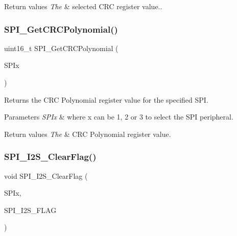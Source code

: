 \begin{DoxyRetVals}{Return values}
{\em The} & selected C\+RC register value.. \\
\hline
\end{DoxyRetVals}
\mbox{\label{group___s_p_i___exported___functions_ga80fb9374cfce670f29128bb78568353f}} 
\subsubsection{\texorpdfstring{SPI\_GetCRCPolynomial()}{SPI\_GetCRCPolynomial()}}
{\footnotesize\ttfamily uint16\+\_\+t S\+P\+I\+\_\+\+Get\+C\+R\+C\+Polynomial (\begin{DoxyParamCaption}\item[{\mbox{\hyperlink{struct_s_p_i___type_def}{S\+P\+I\+\_\+\+Type\+Def}} $\ast$}]{S\+P\+Ix }\end{DoxyParamCaption})}



Returns the C\+RC Polynomial register value for the specified S\+PI. 


\begin{DoxyParams}{Parameters}
{\em S\+P\+Ix} & where x can be 1, 2 or 3 to select the S\+PI peripheral. \\
\hline
\end{DoxyParams}

\begin{DoxyRetVals}{Return values}
{\em The} & C\+RC Polynomial register value. \\
\hline
\end{DoxyRetVals}
\mbox{\label{group___s_p_i___exported___functions_ga3aabd9e2437e213056c0ed9bdfa1a724}} 
\subsubsection{\texorpdfstring{SPI\_I2S\_ClearFlag()}{SPI\_I2S\_ClearFlag()}}
{\footnotesize\ttfamily void S\+P\+I\+\_\+\+I2\+S\+\_\+\+Clear\+Flag (\begin{DoxyParamCaption}\item[{\mbox{\hyperlink{struct_s_p_i___type_def}{S\+P\+I\+\_\+\+Type\+Def}} $\ast$}]{S\+P\+Ix,  }\item[{uint16\+\_\+t}]{S\+P\+I\+\_\+\+I2\+S\+\_\+\+F\+L\+AG }\end{DoxyParamCaption})}



